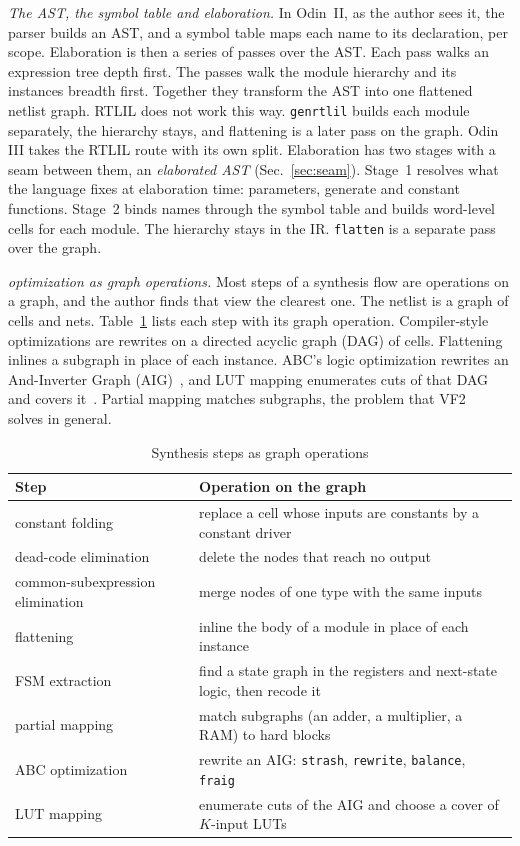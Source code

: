 \documentclass[conference]{IEEEtran}
\newcommand{\code}[1]{\texttt{#1}}
\begin{document}
\emph{The AST, the symbol table and elaboration.} In Odin~II, as the author sees it, the parser
builds an AST, and a symbol table maps each name to its declaration, per scope. Elaboration is
then a series of passes over the AST. Each pass walks an expression tree depth first. The
passes walk the module hierarchy and its instances breadth first. Together they transform the
AST into one flattened netlist graph. RTLIL does not work this way. \code{genrtlil} builds each
module separately, the hierarchy stays, and flattening is a later pass on the graph. Odin III
takes the RTLIL route with its own split. Elaboration has two stages with a seam between them, an
\emph{elaborated AST} (Sec.~\ref{sec:seam}). Stage~1 resolves what the language fixes at
elaboration time: parameters, generate and constant functions. Stage~2 binds names through the
symbol table and builds word-level cells for each module. The hierarchy stays in the IR.
\code{flatten} is a separate pass over the graph.

\emph{optimization as graph operations.} Most steps of a synthesis flow are operations on a
graph, and the author finds that view the clearest one. The netlist is a graph of cells and nets.
Table~\ref{tab:graph} lists each step with its graph operation. Compiler-style optimizations are
rewrites on a directed acyclic graph (DAG) of cells. Flattening inlines a subgraph in place of
each instance. ABC's logic optimization rewrites an And-Inverter Graph
(AIG)~, and LUT mapping enumerates cuts of that
DAG and covers it~. Partial mapping matches subgraphs, the problem that
VF2~ solves in general.

\begin{table}[t]
\caption{Synthesis steps as graph operations}
\label{tab:graph}
\centering
\footnotesize
\begin{tabular}{@{}>{\raggedright\arraybackslash}p{}%
  >{\raggedright\arraybackslash}p{}@{}}
\toprule
Step & Operation on the graph \\
\midrule
constant folding & replace a cell whose inputs are constants by a constant driver \\
dead-code elimination & delete the nodes that reach no output \\
common-subexpression elimination & merge nodes of one type with the same inputs \\
flattening & inline the body of a module in place of each instance \\
FSM extraction & find a state graph in the registers and next-state logic, then recode it \\
partial mapping & match subgraphs (an adder, a multiplier, a RAM) to hard blocks \\
ABC optimization & rewrite an AIG: \code{strash}, \code{rewrite}, \code{balance}, \code{fraig} \\
LUT mapping & enumerate cuts of the AIG and choose a cover of $K$-input LUTs \\
\bottomrule
\end{tabular}
\end{table}
\end{document}
